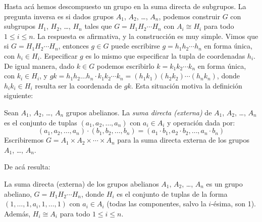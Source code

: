   Hasta acá hemos descompuesto un grupo en la suma directa de subgrupos.
  La pregunta inversa es si
  dados grupos \(A_1\), \(A_2\), \ldots, \(A_n\),
  podemos construir \(G\) con subgrupos \(H_1\), \(H_2\), \ldots, \(H_n\)
  tales que \(G = H_1 H_2 \dotsb H_n\)
  con \(A_i \cong H_i\) para todo \(1 \le i \le n\).
  La respuesta es afirmativa,
  y la construcción es muy simple.
  Vimos que si \(G = H_1 H_2 \dotsb H_n\),
  entonces \(g \in G\)
  puede escribirse \(g = h_1 h_2 \dotsm h_n\) en forma única,
  con \(h_i \in H_i\).
  Especificar \(g\) es lo mismo que especificar la tupla de coordenadas
  \(h_i\).
  De igual manera,
  dado \(k \in G\)
  podemos escribirlo \(k = k_1 k_2 \dotsm k_n\) en forma única,
  con \(k_i \in H_i\),
  y \(g k = h_1 h_2 \dotso h_n \cdot k_1 k_2 \dotsm k_n
	 = (h_1 k_1) (h_2 k_2) \dotsm (h_n k_n)\),
  donde \(h_i k_i \in H_i\) resulta ser la coordenada de \(g k\).
  Esta situación motiva la definición siguiente:
  \begin{definition}
    Sean \(A_1\), \(A_2\), \ldots, \(A_n\) grupos abelianos.
    La \emph{suma directa (externa)} de \(A_1\), \(A_2\), \ldots, \(A_n\)
    es el conjunto de tuplas \((a_1, a_2, \dotsc, a_n)\) con \(a_i \in A_i\)
    y operación dada por:
    \begin{equation*}
      (a_1, a_2, \dotsc, a_n) \cdot (b_1, b_2, \dotsc, b_n)
	= (a_1 \cdot b_1, a_2 \cdot b_2, \dotsc, a_n \cdot b_n)
    \end{equation*}
    Escribiremos \(G = A_1 \times A_2 \times \dotsb \times A_n\)
    para la suma directa externa de los grupos \(A_1\), \ldots, \(A_n\).
  \end{definition}
  De acá resulta:
  \begin{theorem}
    \label{theo:suma-directa-externa}
    La suma directa (externa)
    de los grupos abelianos \(A_1\), \(A_2\), \ldots, \(A_n\)
    es un grupo abeliano,
    \(G = H_1 H_2 \dotsb H_n\),
    donde \(H_i\) es el conjunto de tuplas
    de la forma \((1, \dotsc, 1, a_i, 1, \dotsc, 1)\)
    con \(a_i \in A_i\)
    (todas las componentes, salvo la \(i\)\nobreakdash-ésima, son 1).
    Además,
    \(H_i \cong A_i\) para todo \(1 \le i \le n\).
  \end{theorem}
